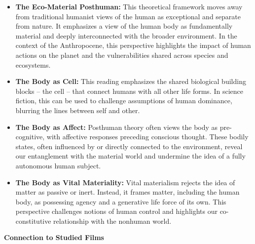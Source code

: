 \documentclass[11pt,fleqn]{book}
\begin{document}
\begin{itemize}
\item \textbf{The Eco-Material Posthuman:} This theoretical framework moves away from traditional humanist views of the human as exceptional and separate from nature. It emphasizes a view of the human body as fundamentally material and deeply interconnected with the broader environment. In the context of the Anthropocene, this perspective highlights the impact of human actions on the planet and the vulnerabilities shared across species and ecosystems.

\item \textbf{The Body as Cell:} This reading emphasizes the shared biological building blocks – the cell – that connect humans with all other life forms. In science fiction, this can be used to challenge assumptions of human dominance, blurring the lines between self and other.

\item \textbf{The Body as Affect:} Posthuman theory often views the body as pre-cognitive, with affective responses preceding conscious thought. These bodily states, often influenced by or directly connected to the environment, reveal our entanglement with the material world and undermine the idea of a fully autonomous human subject.  

\item \textbf{The Body as Vital Materiality:} Vital materialism rejects the idea of matter as passive or inert. Instead, it frames matter, including the human body, as possessing agency and a generative life force of its own. This perspective challenges notions of human control and highlights our co-constitutive relationship with the nonhuman world.
\end{itemize}

\vspace{5pt}
\textbf{Connection to Studied Films}
\end{document}
